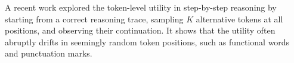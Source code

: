 
A recent work \citep{bigelow2024can} explored the token-level utility in step-by-step reasoning by starting from a correct reasoning trace, sampling $K$ alternative tokens at all positions, and observing their continuation. It shows that the utility often abruptly drifts in seemingly random token positions, such as functional words and punctuation marks.